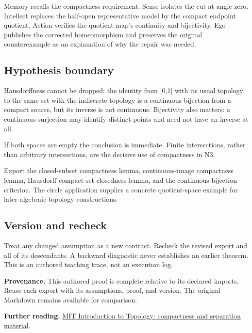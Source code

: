 \documentclass[preprint,12pt,aps,pra,showkeys,amsmath,amssymb,superscriptaddress,floatfix]{revtex4-2}
\theoremstyle{definition}
\theoremstyle{remark}
\begin{document}
Memory recalls the compactness requirement. Sense isolates the cut at
angle zero. Intellect replaces the half-open representative model by the
compact endpoint quotient. Action verifies the quotient map's continuity
and bijectivity. Ego publishes the corrected homeomorphism and preserves
the original counterexample as an explanation of why the repair was
needed.

\subsection{Hypothesis boundary}
Hausdorffness cannot be dropped: the identity from {[}0,1{]} with its
usual topology to the same set with the indiscrete topology is a
continuous bijection from a compact source, but its inverse is not
continuous. Bijectivity also matters: a continuous surjection may
identify distinct points and need not have an inverse at all.

If both spaces are empty the conclusion is immediate. Finite
intersections, rather than arbitrary intersections, are the decisive use
of compactness in N3.

Export the closed-subset compactness lemma, continuous-image compactness
lemma, Hausdorff compact-set closedness lemma, and the
continuous-bijection criterion. The circle application supplies a
concrete quotient-space example for later algebraic topology
constructions.

\subsection{Version and recheck}
Treat any changed assumption as a new contract. Recheck the revised
export and all of its descendants. A backward diagnostic never
establishes an earlier theorem. This is an authored teaching trace, not
an execution log.

\par\medskip\begingroup\small\linespread{1.0}\selectfont\noindent\textbf{Provenance.} This authored proof is complete relative to its declared imports. Reuse
each export with its assumptions, proof, and version. The original
Markdown remains available for comparison.
\par\endgroup

\par\smallskip\begingroup\small\linespread{1.0}\selectfont\noindent\textbf{Further reading.} \href{https://ocw.mit.edu/courses/18-901-introduction-to-topology-fall-2004/pages/lecture-notes/}{MIT
Introduction to Topology: compactness and separation material}.\par\endgroup
\end{document}
